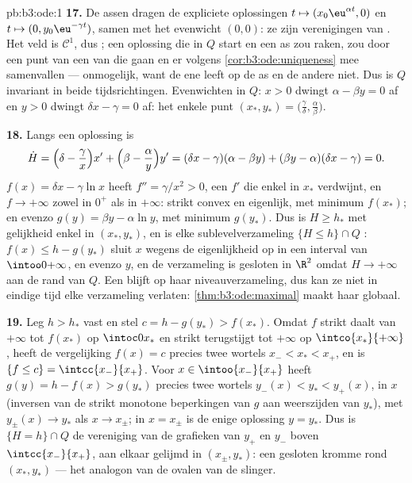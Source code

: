 \begin{solution}{pb:b3:ode:1}
\textbf{17.} De assen dragen de expliciete oplossingen $t \mapsto
(x_0\eu^{\alpha t}, 0)$ en $t \mapsto (0, y_0\eu^{-\gamma t})$,
samen met het evenwicht $(0, 0)$: ze zijn verenigingen van .
Het veld is $\mathcal C^1$, dus ; een oplossing
die in $Q$ start en een as zou raken, zou door een punt van een
van die  gaan en er volgens
\cref{cor:b3:ode:uniqueness} mee samenvallen --- onmogelijk, want
de ene leeft op de as en de andere niet. Dus is $Q$ invariant in
beide tijdsrichtingen. Evenwichten in $Q$: $x > 0$ dwingt $\alpha
- \beta y = 0$ af en $y > 0$ dwingt $\delta x - \gamma = 0$ af:
het enkele punt $(x_*, y_*) = \bigl(\frac\gamma\delta,
\frac\alpha\beta\bigr)$.

\textbf{18.} Langs een oplossing is
\[
\dot H = \Bigl(\delta - \frac\gamma x\Bigr)x' +
\Bigl(\beta - \frac\alpha y\Bigr)y'
= (\delta x - \gamma)(\alpha - \beta y) +
(\beta y - \alpha)(\delta x - \gamma) = 0 .
\]
$f(x) = \delta x - \gamma\ln x$ heeft $f'' = \gamma/x^2 > 0$, een
$f'$ die enkel in $x_*$ verdwijnt, en $f \to +\infty$ zowel in
$0^+$ als in $+\infty$: strikt convex en eigenlijk, met minimum
$f(x_*)$; en evenzo $g(y) = \beta y - \alpha\ln y$, met minimum
$g(y_*)$. Dus is $H \geq h_*$ met gelijkheid enkel in $(x_*,
y_*)$, en is elke sublevelverzameling $\{H \leq h\}\cap Q$
: $f(x) \leq h - g(y_*)$ sluit $x$ wegens de
eigenlijkheid op in een  interval van $\intoo0{+\infty}$,
en evenzo $y$, en de verzameling is gesloten in $\R^2$ omdat $H
\to +\infty$ aan de rand van $Q$. Een  blijft
op haar  niveauverzameling, dus kan ze niet in eindige
tijd elke  verzameling verlaten:
\cref{thm:b3:ode:maximal} maakt haar globaal.

\textbf{19.} Leg $h > h_*$ vast en stel $c = h - g(y_*) >
f(x_*)$. Omdat $f$ strikt daalt van $+\infty$ tot $f(x_*)$ op
$\intoc0{x_*}$ en strikt terugstijgt tot $+\infty$ op
$\intco{x_*}{+\infty}$, heeft de vergelijking $f(x) = c$ precies
twee wortels $x_- < x_* < x_+$, en is $\{f \leq c\} =
\intcc{x_-}{x_+}$. Voor $x \in \intoo{x_-}{x_+}$ heeft $g(y) = h
- f(x) > g(y_*)$ precies twee wortels $y_-(x) < y_* < y_+(x)$,
 in $x$ (inversen van de strikt monotone 
beperkingen van $g$ aan weerszijden van $y_*$), met $y_\pm(x) \to
y_*$ als $x \to x_\pm$; in $x = x_\pm$ is de enige oplossing $y =
y_*$. Dus is $\{H = h\}\cap Q$ de vereniging van de grafieken van
$y_+$ en $y_-$ boven $\intcc{x_-}{x_+}$, aan elkaar gelijmd in
$(x_\pm, y_*)$: een gesloten kromme rond $(x_*, y_*)$ --- het
analogon van de ovalen van de slinger.


\end{solution}
